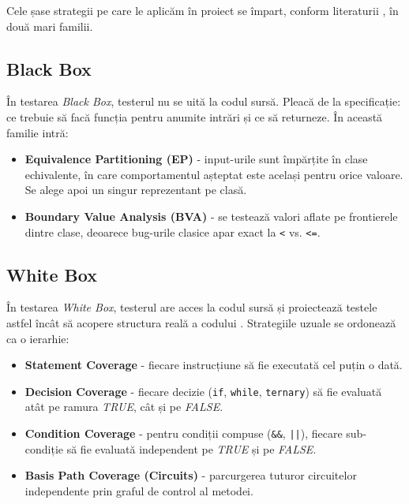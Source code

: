 Cele șase strategii pe care le aplicăm în proiect se împart, conform literaturii \cite{myers2011, fmi_functional_2024}, în două mari familii.

\subsection{Black Box}

În testarea \textit{Black Box}, testerul nu se uită la codul sursă. Pleacă de la specificație: ce trebuie să facă funcția pentru anumite intrări și ce să returneze. În această familie intră:

\begin{itemize}
    \item \textbf{Equivalence Partitioning (EP)} - input-urile sunt împărțite în clase echivalente, în care comportamentul așteptat este același pentru orice valoare. Se alege apoi un singur reprezentant pe clasă.
    \item \textbf{Boundary Value Analysis (BVA)} - se testează valori aflate pe frontierele dintre clase, deoarece bug-urile clasice apar exact la \texttt{<} vs. \texttt{<=}.
\end{itemize}

\subsection{White Box}

În testarea \textit{White Box}, testerul are acces la codul sursă și proiectează testele astfel încât să acopere structura reală a codului \cite{fmi_structural_2024}. Strategiile uzuale se ordonează ca o ierarhie:

\begin{itemize}
    \item \textbf{Statement Coverage} - fiecare instrucțiune să fie executată cel puțin o dată.
    \item \textbf{Decision Coverage} - fiecare decizie (\texttt{if}, \texttt{while}, \texttt{ternary}) să fie evaluată atât pe ramura \textit{TRUE}, cât și pe \textit{FALSE}.
    \item \textbf{Condition Coverage} - pentru condiții compuse (\texttt{\&\&}, \texttt{||}), fiecare sub-condiție să fie evaluată independent pe \textit{TRUE} și pe \textit{FALSE}.
    \item \textbf{Basis Path Coverage (Circuits)} - parcurgerea tuturor circuitelor independente prin graful de control al metodei.
\end{itemize}

